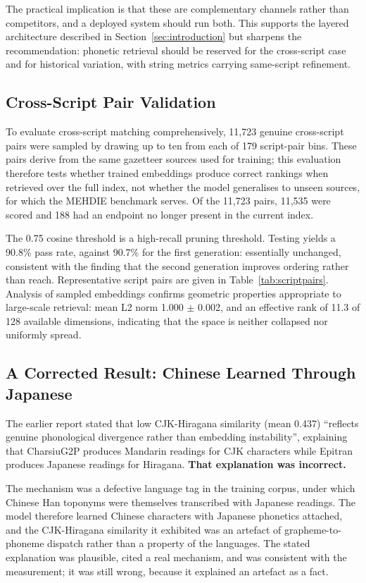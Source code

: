 \documentclass[11pt,a4paper]{article}
\begin{document}
The practical implication is that these are complementary channels rather than competitors, and a deployed system should run both. This supports the layered architecture described in Section~\ref{sec:introduction} but sharpens the recommendation: phonetic retrieval should be reserved for the cross-script case and for historical variation, with string metrics carrying same-script refinement.

\subsection{Cross-Script Pair Validation}
\label{subsec:crossscript}

To evaluate cross-script matching comprehensively, 11,723 genuine cross-script pairs were sampled by drawing up to ten from each of 179 script-pair bins. These pairs derive from the same gazetteer sources used for training; this evaluation therefore tests whether trained embeddings produce correct rankings when retrieved over the full index, not whether the model generalises to unseen sources, for which the MEHDIE benchmark serves. Of the 11,723 pairs, 11,535 were scored and 188 had an endpoint no longer present in the current index.

The 0.75 cosine threshold is a high-recall pruning threshold. Testing yields a 90.8\% pass rate, against 90.7\% for the first generation: essentially unchanged, consistent with the finding that the second generation improves ordering rather than reach. Representative script pairs are given in Table~\ref{tab:scriptpairs}. Analysis of sampled embeddings confirms geometric properties appropriate to large-scale retrieval: mean L2 norm 1.000 $\pm$ 0.002, and an effective rank of 11.3 of 128 available dimensions, indicating that the space is neither collapsed nor uniformly spread.

\subsection{A Corrected Result: Chinese Learned Through Japanese}
\label{subsec:contamination}

The earlier report stated that low CJK-Hiragana similarity (mean 0.437) ``reflects genuine phonological divergence rather than embedding instability'', explaining that CharsiuG2P produces Mandarin readings for CJK characters while Epitran produces Japanese readings for Hiragana. \textbf{That explanation was incorrect.}

The mechanism was a defective language tag in the training corpus, under which Chinese Han toponyms were themselves transcribed with Japanese readings. The model therefore learned Chinese characters with Japanese phonetics attached, and the CJK-Hiragana similarity it exhibited was an artefact of grapheme-to-phoneme dispatch rather than a property of the languages. The stated explanation was plausible, cited a real mechanism, and was consistent with the measurement; it was still wrong, because it explained an artefact as a fact.
\end{document}
